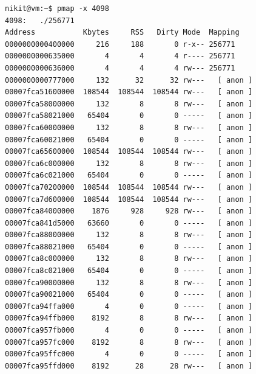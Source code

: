 \documentclass[11pt, a4paper]{article}
\begin{document}
\begin{Verbatim}[fontsize=\small]
nikit@vm:~$ pmap -x 4098
4098:   ./256771
Address           Kbytes     RSS   Dirty Mode  Mapping
0000000000400000     216     188       0 r-x-- 256771
0000000000635000       4       4       4 r---- 256771
0000000000636000       4       4       4 rw--- 256771
0000000000777000     132      32      32 rw---   [ anon ]
00007fca51600000  108544  108544  108544 rw---   [ anon ]
00007fca58000000     132       8       8 rw---   [ anon ]
00007fca58021000   65404       0       0 -----   [ anon ]
00007fca60000000     132       8       8 rw---   [ anon ]
00007fca60021000   65404       0       0 -----   [ anon ]
00007fca65600000  108544  108544  108544 rw---   [ anon ]
00007fca6c000000     132       8       8 rw---   [ anon ]
00007fca6c021000   65404       0       0 -----   [ anon ]
00007fca70200000  108544  108544  108544 rw---   [ anon ]
00007fca7d600000  108544  108544  108544 rw---   [ anon ]
00007fca84000000    1876     928     928 rw---   [ anon ]
00007fca841d5000   63660       0       0 -----   [ anon ]
00007fca88000000     132       8       8 rw---   [ anon ]
00007fca88021000   65404       0       0 -----   [ anon ]
00007fca8c000000     132       8       8 rw---   [ anon ]
00007fca8c021000   65404       0       0 -----   [ anon ]
00007fca90000000     132       8       8 rw---   [ anon ]
00007fca90021000   65404       0       0 -----   [ anon ]
00007fca94ffa000       4       0       0 -----   [ anon ]
00007fca94ffb000    8192       8       8 rw---   [ anon ]
00007fca957fb000       4       0       0 -----   [ anon ]
00007fca957fc000    8192       8       8 rw---   [ anon ]
00007fca95ffc000       4       0       0 -----   [ anon ]
00007fca95ffd000    8192      28      28 rw---   [ anon ]

\end{Verbatim}
\end{document}
